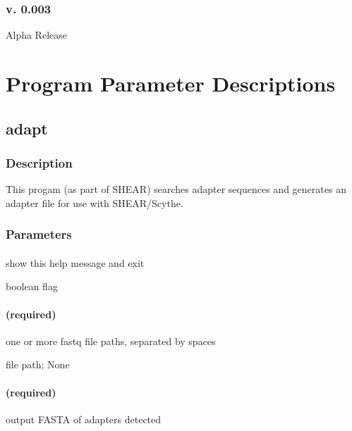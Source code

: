 \documentclass[letterpaper,11pt,english]{sphinxmanual}
\begin{document}
\subsection{v. 0.003}
\label{\detokenize{intro:v-0-003}}
Alpha Release


\chapter{Program Parameter Descriptions}
\label{\detokenize{prog_desc:program-parameter-descriptions}}\label{\detokenize{prog_desc::doc}}

\section{adapt}
\label{\detokenize{prog_desc:adapt}}

\subsection{Description}
\label{\detokenize{prog_desc:description}}
This progam (as part of SHEAR) searches adapter sequences
and generates an adapter file for use with SHEAR/Scythe.


\subsection{Parameters}
\label{\detokenize{prog_desc:parameters}}

\subsubsection{}
\label{\detokenize{prog_desc:h-help}}
 show this help message and exit

 boolean flag


\subsubsection{ (required)}
\label{\detokenize{prog_desc:fq1-required}}
 one or more fastq file paths, separated by spaces

 file path;  None


\subsubsection{ (required)}
\label{\detokenize{prog_desc:o-out-required}}
 output FASTA of adapters detected
\end{document}
